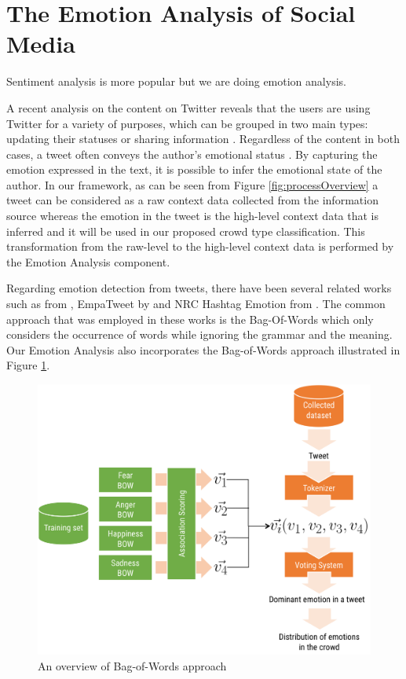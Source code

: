 \section{The Emotion Analysis of Social Media}
Sentiment analysis is more popular but we are doing emotion analysis.

A recent analysis on the content on Twitter reveals that the users are using Twitter for a variety of purposes, which can be grouped in two main types: updating their statuses or sharing information \citep{java2007we}. Regardless of the content in both cases, a tweet often conveys the author's emotional status \citep{bollen2009modeling}. By capturing the emotion expressed in the text, it is possible to infer the emotional state of the author. In our framework, as can be seen from Figure \ref{fig:processOverview} a tweet can be considered as a raw context data collected from the information source whereas the emotion in the tweet is the high-level context data that is inferred and it will be used in our proposed crowd type classification. This transformation from the raw-level to the high-level context data is performed by the Emotion Analysis component. 

Regarding emotion detection from tweets, there have been several related works such as from \citet{bollen2009modeling}, EmpaTweet by \citet{roberts2012empatweet} and NRC Hashtag Emotion from \citet{mohammad2014using}. The common approach that was employed in these works is the Bag-Of-Words which only considers the occurrence of words while ignoring the grammar and the meaning. Our Emotion Analysis also incorporates the Bag-of-Words approach illustrated in Figure \ref{fig:bagOfWord}.

\begin{figure}[htb!] 
\centering    
\includegraphics[width=1.0\textwidth]{BagOfWord}
\caption{An overview of Bag-of-Words approach}
\label{fig:bagOfWord}
\end{figure}

